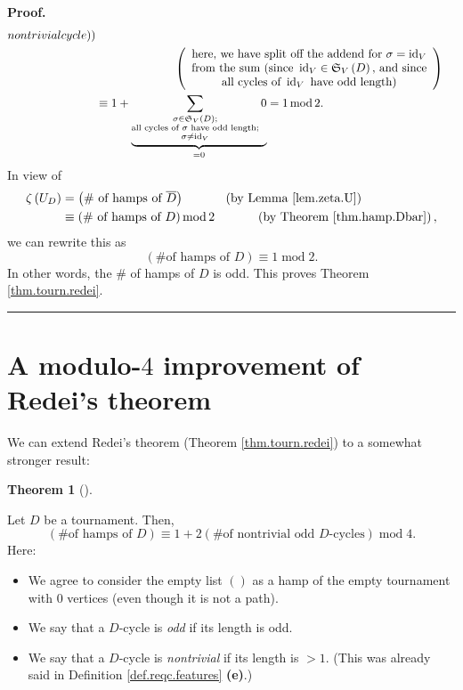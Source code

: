 \documentclass[numbers=enddot,12pt,final,onecolumn,notitlepage]{scrartcl}%
\numberwithin{exer}{section}
\theoremstyle{definition}
\newtheorem{theo}{Theorem}[section]
\newenvironment{theorem}[1][]
{\begin{theo}[#1]\begin{leftbar}}
{\end{leftbar}\end{theo}}
\newenvironment{proof}[1][Proof]{\noindent\textbf{#1.} }{\ \rule{0.5em}{0.5em}}
\let\sumnonlimits\sum
\renewcommand{\sum}{\sumnonlimits\limits}
\begin{document}
\begin{proof}
\begin{align}
{{{nontrivial cycle))}}}\nonumber\\
&  \ \ \ \ \ \ \ \ \ \ \ \ \ \ \ \ \ \ \ \ \left(
\begin{array}
[c]{c}%
\text{here, we have split off the addend for }\sigma=\operatorname*{id}%
\nolimits_{V}\\
\text{from the sum (since }\operatorname*{id}\nolimits_{V}\in\mathfrak{S}%
_{V}\left(  D\right)  \text{, and since}\\
\text{all cycles of }\operatorname*{id}\nolimits_{V}\text{ have odd length)}%
\end{array}
\right) \nonumber\\
&  \equiv1+\underbrace{\sum_{\substack{\sigma\in\mathfrak{S}_{V}\left(
D\right)  ;\\\text{all cycles of }\sigma\text{ have odd length;}\\\sigma
\neq\operatorname*{id}\nolimits_{V}}}0}_{=0}=1\operatorname{mod}2.\nonumber
\end{align}
In view of%
\begin{align*}
\zeta\left(  U_{D}\right)   &  =\left(  \text{\# of hamps of }\overline
{D}\right)  \ \ \ \ \ \ \ \ \ \ \left(  \text{by Lemma \ref{lem.zeta.U}%
}\right) \\
&  \equiv\left(  \text{\# of hamps of }D\right)  \operatorname{mod}%
2\ \ \ \ \ \ \ \ \ \ \left(  \text{by Theorem \ref{thm.hamp.Dbar}}\right)  ,
\end{align*}
we can rewrite this as%
\[
\left(  \text{\# of hamps of }D\right)  \equiv1\operatorname{mod}2.
\]
In other words, the \# of hamps of $D$ is odd. This proves Theorem
\ref{thm.tourn.redei}.
\end{proof}

\section{\label{sec.mod4}A modulo-$4$ improvement of Redei's theorem}

We can extend Redei's theorem (Theorem \ref{thm.tourn.redei}) to a somewhat
stronger result:

\begin{theorem}
\label{thm.tourn.mod4}Let $D$ be a tournament. Then,
\[
\left(  \text{\# of hamps of }D\right)  \equiv1+2\left(  \text{\# of
nontrivial odd }D\text{-cycles}\right)  \operatorname{mod}4.
\]
Here:

\begin{itemize}
\item We agree to consider the empty list $\left(  {}\right)  $ as a hamp of
the empty tournament with $0$ vertices (even though it is not a path).

\item We say that a $D$-cycle is \emph{odd} if its length is odd.

\item We say that a $D$-cycle is \emph{nontrivial} if its length is $>1$.
(This was already said in Definition \ref{def.reqc.features} \textbf{(e)}.)
\end{itemize}
\end{theorem}
\end{document}
